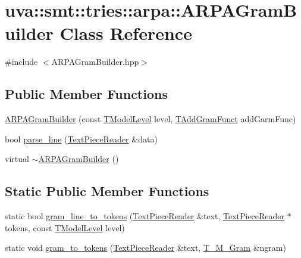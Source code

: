 \hypertarget{classuva_1_1smt_1_1tries_1_1arpa_1_1_a_r_p_a_gram_builder}{}\section{uva\+:\+:smt\+:\+:tries\+:\+:arpa\+:\+:A\+R\+P\+A\+Gram\+Builder Class Reference}
\label{classuva_1_1smt_1_1tries_1_1arpa_1_1_a_r_p_a_gram_builder}


{\ttfamily \#include $<$A\+R\+P\+A\+Gram\+Builder.\+hpp$>$}

\subsection*{Public Member Functions}
\begin{DoxyCompactItemize}
\item 
\hyperlink{classuva_1_1smt_1_1tries_1_1arpa_1_1_a_r_p_a_gram_builder_aa8abc3ee7455801a65da79b7a725e023}{A\+R\+P\+A\+Gram\+Builder} (const \hyperlink{namespaceuva_1_1smt_1_1tries_a20577a44b3a42d26524250634379b7cb}{T\+Model\+Level} level, \hyperlink{namespaceuva_1_1smt_1_1tries_1_1arpa_a9af1fc82824b7244f557bc5a265ce3f0}{T\+Add\+Gram\+Funct} add\+Garm\+Func)
\item 
bool \hyperlink{classuva_1_1smt_1_1tries_1_1arpa_1_1_a_r_p_a_gram_builder_aa44860fddc156c928e9c59a787a96c1c}{parse\+\_\+line} (\hyperlink{classuva_1_1smt_1_1file_1_1_text_piece_reader}{Text\+Piece\+Reader} \&data)
\item 
virtual \hyperlink{classuva_1_1smt_1_1tries_1_1arpa_1_1_a_r_p_a_gram_builder_ab65614501c700f5654ddd3397050e671}{$\sim$\+A\+R\+P\+A\+Gram\+Builder} ()
\end{DoxyCompactItemize}
\subsection*{Static Public Member Functions}
\begin{DoxyCompactItemize}
\item 
static bool \hyperlink{classuva_1_1smt_1_1tries_1_1arpa_1_1_a_r_p_a_gram_builder_a24f3823ba4df729bbbbbce13cd54d235}{gram\+\_\+line\+\_\+to\+\_\+tokens} (\hyperlink{classuva_1_1smt_1_1file_1_1_text_piece_reader}{Text\+Piece\+Reader} \&text, \hyperlink{classuva_1_1smt_1_1file_1_1_text_piece_reader}{Text\+Piece\+Reader} $\ast$tokens, const \hyperlink{namespaceuva_1_1smt_1_1tries_a20577a44b3a42d26524250634379b7cb}{T\+Model\+Level} level)
\item 
static void \hyperlink{classuva_1_1smt_1_1tries_1_1arpa_1_1_a_r_p_a_gram_builder_ad42dc31844f19e4be3f2a3a628820965}{gram\+\_\+to\+\_\+tokens} (\hyperlink{classuva_1_1smt_1_1file_1_1_text_piece_reader}{Text\+Piece\+Reader} \&text, \hyperlink{structuva_1_1smt_1_1tries_1_1mgrams_1_1_t___m___gram}{T\+\_\+\+M\+\_\+\+Gram} \&ngram)
\end{DoxyCompactItemize}
